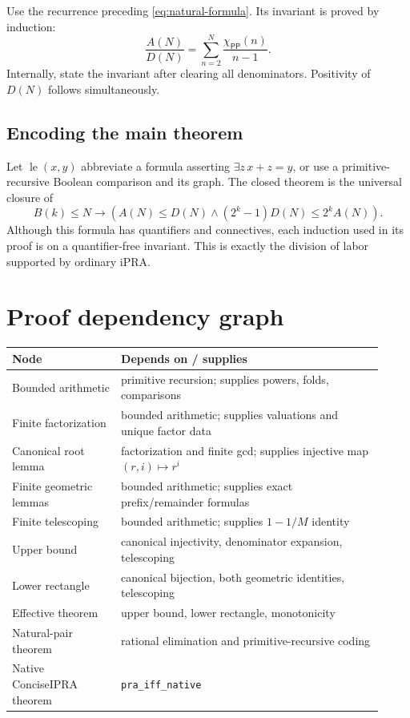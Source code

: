 \documentclass[11pt]{article}
\theoremstyle{definition}
\newcommand{\PP}{\mathsf{PP}}
\begin{document}
Use the recurrence preceding \eqref{eq:natural-formula}.  Its invariant is
proved by induction:
\[
  \frac{A(N)}{D(N)}=
  \sum_{n=2}^{N}\frac{\chi_{\PP}(n)}{n-1}.
\]
Internally, state the invariant after clearing all denominators.  Positivity of
$D(N)$ follows simultaneously.

\subsection{Encoding the main theorem}

Let $\operatorname{le}(x,y)$ abbreviate a formula asserting
$\exists z\,x+z=y$, or use a primitive-recursive Boolean comparison and its
graph.  The closed theorem is the universal closure of
\[
  B(k)\le N\to
  \left(A(N)\le D(N)\wedge
  (2^k-1)D(N)\le2^kA(N)\right).
\]
Although this formula has quantifiers and connectives, each induction used in
its proof is on a quantifier-free invariant.  This is exactly the division of
labor supported by ordinary iPRA.

\section{Proof dependency graph}

\begin{center}
\begin{tabular}{p{0.27\linewidth}p{0.65\linewidth}}
\toprule
Node & Depends on / supplies\\
\midrule
Bounded arithmetic & primitive recursion; supplies powers, folds, comparisons\\
Finite factorization & bounded arithmetic; supplies valuations and unique factor data\\
Canonical root lemma & factorization and finite gcd; supplies injective map $(r,i)\mapsto r^i$\\
Finite geometric lemmas & bounded arithmetic; supplies exact prefix/remainder formulas\\
Finite telescoping & bounded arithmetic; supplies $1-1/M$ identity\\
Upper bound & canonical injectivity, denominator expansion, telescoping\\
Lower rectangle & canonical bijection, both geometric identities, telescoping\\
Effective theorem & upper bound, lower rectangle, monotonicity\\
Natural-pair theorem & rational elimination and primitive-recursive coding\\
Native ConciseIPRA theorem & \texttt{pra\_iff\_native}\\
\bottomrule
\end{tabular}
\end{center}
\end{document}
